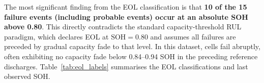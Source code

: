 The most significant finding from the EOL classification is that
\textbf{10 of the 15 failure events (including probable events) occur
at an absolute SOH above 0.80}.  This directly contradicts the
standard capacity-threshold RUL paradigm, which declares EOL at
$\mathrm{SOH} = 0.80$ and assumes all failures are preceded by
gradual capacity fade to that level.  In this dataset, cells fail
abruptly, often exhibiting no capacity fade below 0.84--0.94
SOH in the preceding reference discharges.  Table~\ref{tab:eol_labels}
summarises the EOL classifications and last observed SOH.

\begin{table}[htbp]
  \centering
  \caption{End-of-life (EOL) classification by pack for the original cohort ($N=23$).}
  \label{tab:eol_labels}
\end{table}

